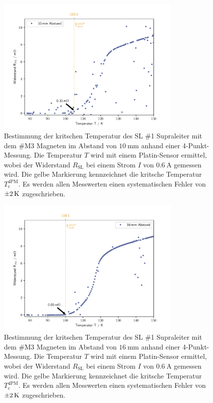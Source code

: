 \begin{figure}[H]
    \centering
    \includegraphics[width=0.8\textwidth]{Auswertung/T_krit_Pt/R_T_10mm.pdf}
    \caption{Bestimmung der kritschen Temperatur des SL \#1 Supraleiter mit dem
		\#M3 Magneten im Abstand von $\SI{10}{\milli\meter}$ anhand einer 4-Punkt-Messung.
		Die Temperatur $T$ wird mit einem Platin-Sensor	ermittel, wobei der Widerstand
		$R_{\text{SL}}$ bei einem Strom $I$ von $\SI{0.6}{\ampere}$ gemessen wird.
		Die gelbe Markierung kennzeichnet die kritsche Temperatur $T^{\text{4PM}}_{\text{c}}$.
		Es werden allen Messwerten einen systematischen Fehler von $\SI{\pm2}{\kelvin}$
		zugeschrieben.}
    \label{fig:Tc4PM10}
\end{figure}

\begin{figure}[H]
    \centering
    \includegraphics[width=0.8\textwidth]{Auswertung/T_krit_Pt/R_T_16mm.pdf}
    \caption{Bestimmung der kritschen Temperatur des SL \#1 Supraleiter mit dem
		\#M3 Magneten im Abstand von $\SI{16}{\milli\meter}$ anhand einer 4-Punkt-Messung.
		Die Temperatur $T$ wird mit einem Platin-Sensor	ermittel, wobei der Widerstand
		$R_{\text{SL}}$ bei einem Strom $I$ von $\SI{0.6}{\ampere}$ gemessen wird.
		Die gelbe Markierung kennzeichnet die kritsche Temperatur	$T^{\text{4PM}}_{\text{c}}$.
		Es werden allen Messwerten einen systematischen Fehler von $\SI{\pm2}{\kelvin}$
		zugeschrieben.}
    \label{fig:Tc4PM16}
\end{figure}

